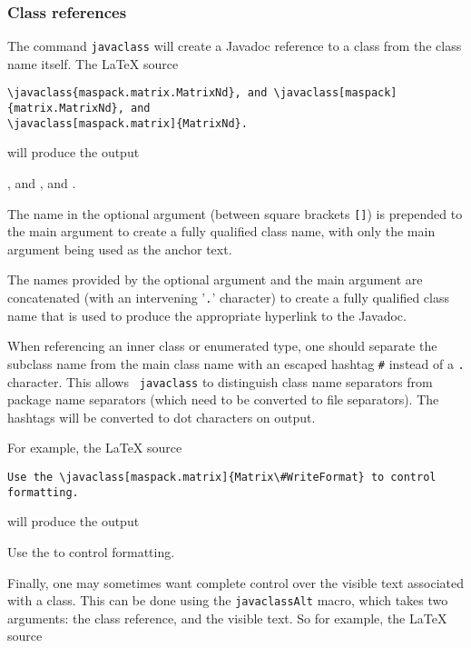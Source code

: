 \documentclass{article}
\begin{document}
\subsubsection{Class references}
\label{ClassRefsSec}

The command {\tt \BKS javaclass} will create a Javadoc reference to 
a class from the class name itself. The LaTeX source

\begin{lstlisting}[]
\javaclass{maspack.matrix.MatrixNd}, and \javaclass[maspack]{matrix.MatrixNd}, and
\javaclass[maspack.matrix]{MatrixNd}.
\end{lstlisting}

will produce the output

, and , and
.

The name in the optional argument (between square brackets {\tt []})
is prepended to the main argument to create a fully qualified class name,
with only the main argument being used as the anchor text. 

The names provided by the optional argument and the main argument are
concatenated (with an intervening '{\tt .}' character) to create a
fully qualified class name that is used to produce the appropriate
hyperlink to the Javadoc. 

When referencing an inner class or enumerated type, one should
separate the subclass name from the main class name with an escaped
hashtag {\tt \#} instead of a {\tt .} character. This allows {\tt \BKS
javaclass} to distinguish class name separators from package name
separators (which need to be converted to file separators). The
hashtags will be converted to dot characters on output.

For example, the LaTeX source 

\begin{lstlisting}[]
Use the \javaclass[maspack.matrix]{Matrix\#WriteFormat} to control formatting.
\end{lstlisting}

will produce the output

Use the  to control formatting.

Finally, one may sometimes want complete control over the visible text
associated with a class. This can be done using the {\tt \BKS javaclassAlt}
macro, which takes two arguments: the class reference, and the visible
text. So for example, the LaTeX source 
\end{document}
